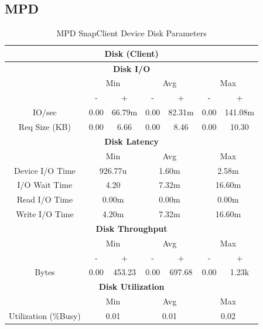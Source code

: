 \documentclass[11pt,a4paper,headinclude=false,footinclude=false]{scrreprt}
\begin{document}
\subsection{MPD}\label{mpd-3}

\begin{table}[H]
\centering
    \begin{tabular}{||c|c|c|c|c|c|c||}
    \hline
    \multicolumn{7}{|c|}{\textbf{Disk (Client)}} \\
    \hline
    \multicolumn{7}{|c|}{\textbf{Disk I/O}} \\
    \hline\hline
      & \multicolumn{2}{|c|}{Min} & \multicolumn{2}{|c|}{Avg} & \multicolumn{2}{|c|}{Max} \\
    \hline
      & - & + & - & + & - & + \\
    \hline
    IO/sec & 0.00 & 66.79m & 0.00 & 82.31m & 0.00 & 141.08m \\
    \hline
    Req Size (KB) & 0.00 & 6.66 & 0.00 & 8.46 & 0.00 & 10.30 \\
    \hline\hline
    \multicolumn{7}{|c|}{\textbf{Disk Latency}} \\
    \hline\hline
      & \multicolumn{2}{|c|}{Min} & \multicolumn{2}{|c|}{Avg} & \multicolumn{2}{|c|}{Max} \\
    \hline
    Device I/O Time  & \multicolumn{2}{|c|}{926.77u} & \multicolumn{2}{|c|}{1.60m} & \multicolumn{2}{|c|}{2.58m} \\
    \hline
    I/O Wait Time  & \multicolumn{2}{|c|}{4.20} & \multicolumn{2}{|c|}{7.32m} & \multicolumn{2}{|c|}{16.60m} \\
    \hline
    Read I/O Time  & \multicolumn{2}{|c|}{0.00m} & \multicolumn{2}{|c|}{0.00m} & \multicolumn{2}{|c|}{0.00m} \\
    \hline
    Write I/O Time  & \multicolumn{2}{|c|}{4.20m} & \multicolumn{2}{|c|}{7.32m} & \multicolumn{2}{|c|}{16.60m} \\
    \hline\hline
    \multicolumn{7}{|c|}{\textbf{Disk Throughput}} \\
    \hline\hline
      & \multicolumn{2}{|c|}{Min} & \multicolumn{2}{|c|}{Avg} & \multicolumn{2}{|c|}{Max} \\
    \hline
      & - & + & - & + & - & + \\
    \hline
    Bytes & 0.00 & 453.23 & 0.00 & 697.68 & 0.00 & 1.23k \\
    \hline\hline
    \multicolumn{7}{|c|}{\textbf{Disk Utilization}} \\
    \hline\hline
      & \multicolumn{2}{|c|}{Min} & \multicolumn{2}{|c|}{Avg} & \multicolumn{2}{|c|}{Max} \\
    \hline
    Utilization (\%Busy)  & \multicolumn{2}{|c|}{0.01} & \multicolumn{2}{|c|}{0.01} & \multicolumn{2}{|c|}{0.02} \\
    \hline\hline
    \end{tabular}
    \caption{MPD SnapClient Device Disk Parameters}
    \label{MPDclientDiskTab}
\end{table}
\end{document}
